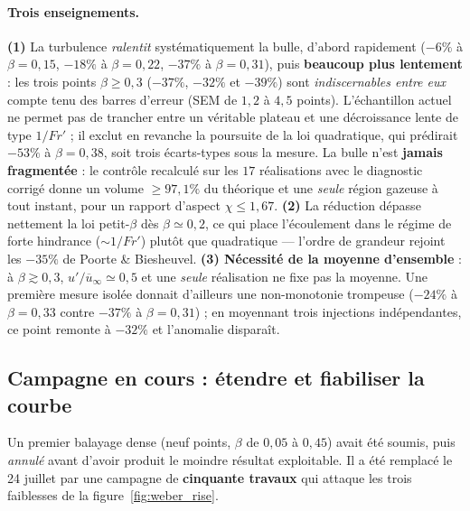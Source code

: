 \paragraph{Trois enseignements.} \textbf{(1)} La turbulence \emph{ralentit}
systématiquement la bulle, d'abord rapidement ($-6\%$ à $\beta=0{,}15$, $-18\%$ à
$\beta=0{,}22$, $-37\%$ à $\beta=0{,}31$), puis \textbf{beaucoup plus lentement} :
les trois points $\beta\ge0{,}3$ ($-37\%$, $-32\%$ et $-39\%$) sont
\emph{indiscernables entre eux} compte tenu des barres d'erreur (SEM de $1{,}2$ à
$4{,}5$ points). L'échantillon actuel ne permet pas de trancher entre un véritable
plateau et une décroissance lente de type $1/Fr'$ ; il exclut en revanche la
poursuite de la loi quadratique, qui prédirait $-53\%$ à $\beta=0{,}38$, soit trois
écarts-types sous la mesure. La bulle n'est \textbf{jamais fragmentée} : le contrôle
recalculé sur les $17$ réalisations avec le diagnostic corrigé donne un volume
$\ge97{,}1\%$ du théorique et une \emph{seule} région gazeuse à tout instant, pour un
rapport d'aspect $\chi\le1{,}67$.
\textbf{(2)} La réduction dépasse nettement la loi petit-$\beta$ dès
$\beta\simeq0{,}2$, ce qui place l'écoulement dans le régime de forte hindrance
($\sim1/Fr'$) plutôt que quadratique --- l'ordre de grandeur rejoint les $-35\%$ de
Poorte \& Biesheuvel.
\textbf{(3) Nécessité de la moyenne d'ensemble} : à $\beta\gtrsim0{,}3$,
$u'/\overline{u}_\infty\simeq0{,}5$ et une \emph{seule} réalisation ne fixe pas la
moyenne. Une première mesure isolée donnait d'ailleurs une non-monotonie trompeuse
($-24\%$ à $\beta=0{,}33$ contre $-37\%$ à $\beta=0{,}31$) ; en moyennant trois
injections indépendantes, ce point remonte à $-32\%$ et l'anomalie disparaît.

\subsection{Campagne en cours : étendre et fiabiliser la courbe}
\label{subsec:campagne}

Un premier balayage dense (neuf points, $\beta$ de $0{,}05$ à $0{,}45$) avait été
soumis, puis \emph{annulé} avant d'avoir produit le moindre résultat exploitable. Il
a été remplacé le 24 juillet par une campagne de \textbf{cinquante travaux} qui
attaque les trois faiblesses de la figure~\ref{fig:weber_rise}.

